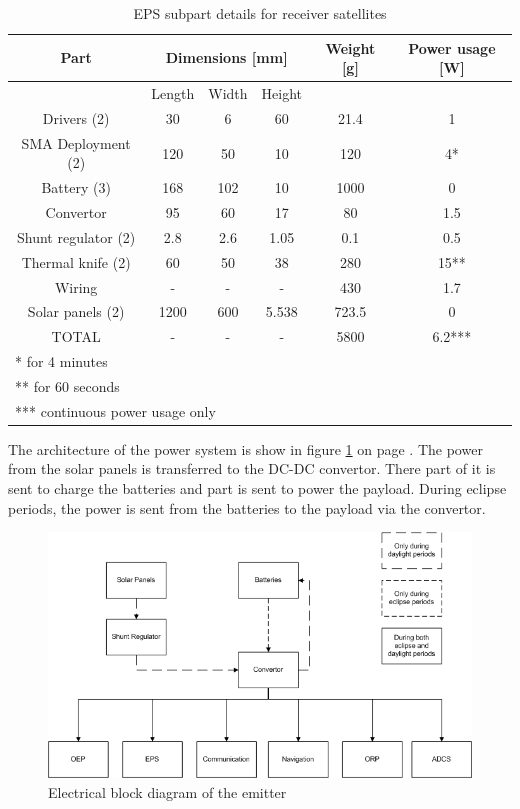 \begin{table}[H!]
\centering
\begin{tabular}{cccccc}
\toprule
Part & \multicolumn{3}{c}{Dimensions [mm]} & Weight [g] & Power usage [W]\\ 
\midrule
 & Length & Width & Height & & \\ 
 Drivers (2) & 30 & 6 & 60 & 21.4 & 1 \\ 
 SMA Deployment (2) & 120 & 50 & 10 & 120 & 4* \\ 
 Battery (3) & 168 & 102 & 10 & 1000 & 0 \\ 
 Convertor & 95 & 60 & 17 & 80 & 1.5 \\ 
 Shunt regulator (2) & 2.8 & 2.6 & 1.05 & 0.1 & 0.5 \\ 
 Thermal knife (2) & 60 & 50 & 38 & 280 & 15**  \\
 Wiring & - & - & - & 430 & 1.7 \\ 
 Solar panels (2) & 1200 & 600 & 5.538 & 723.5 & 0 \\
 \midrule
 TOTAL & - & - & - & 5800 & 6.2***  \\ 
\bottomrule
 \multicolumn{6}{l}{* for 4 minutes} \\
 \multicolumn{6}{l}{** for 60 seconds} \\
 \multicolumn{6}{l}{*** continuous power usage only} \\
\end{tabular}
\caption{EPS subpart details for receiver satellites}
\label{tab:EPS_detailsEm}
\end{table}

The architecture of the power system is show in figure \ref{fig:emitter_block} on page \pageref{fig:emitter_block}. The power from the solar panels is transferred to the DC-DC convertor. There part of it is sent to charge the batteries and part is sent to power the payload. During eclipse periods, the power is sent from the batteries to the payload via the convertor.

\begin{figure}[H!]
\centering
\includegraphics[scale = 0.7]{chapters/img/EPS_emitter_block_diagram.png}
\caption{Electrical block diagram of the emitter}
\label{fig:emitter_block}
\end{figure}
